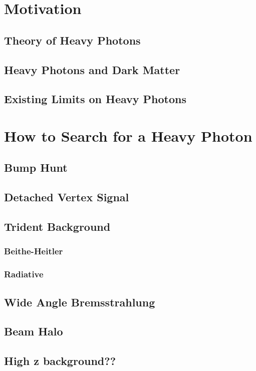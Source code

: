 \documentclass[12pt]{report}
\begin{document}
\chapter{Motivation} %
\section{Theory of Heavy Photons}
\section{Heavy Photons and Dark Matter}
\section{Existing Limits on Heavy Photons}
\chapter{How to Search for a Heavy Photon}%
\section{Bump Hunt}
\section{Detached Vertex Signal}
\section{Trident Background}
\subsection{Beithe-Heitler}
\subsection{Radiative}
\section{Wide Angle Bremsstrahlung}
\section{Beam Halo}
\section{High z background??}
\end{document}
